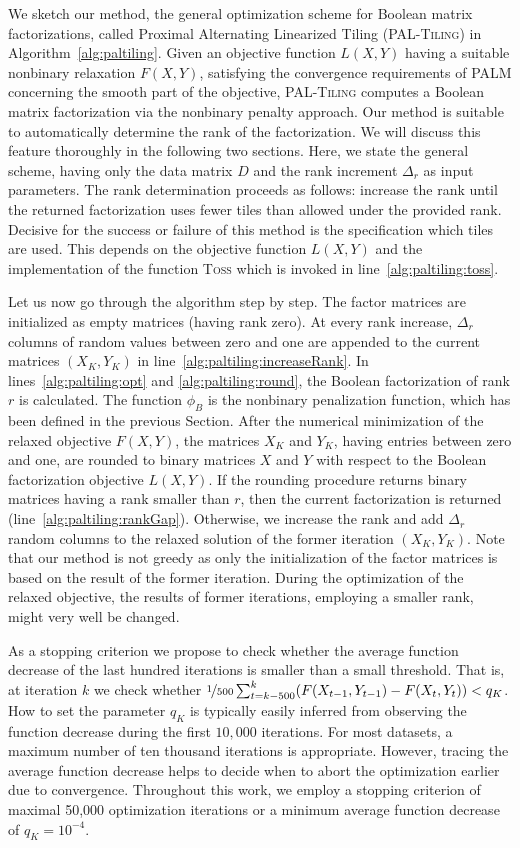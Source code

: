 We sketch our method, the general optimization scheme for Boolean matrix factorizations, called Proximal Alternating Linearized Tiling (\textsc{PAL-Tiling}) in Algorithm~\ref{alg:paltiling}. Given an objective function $L(X,Y)$ having a suitable nonbinary relaxation $F(X,Y)$, satisfying the convergence requirements of PALM concerning the smooth part of the objective, \textsc{PAL-Tiling} computes a Boolean matrix factorization via the nonbinary penalty approach. Our method is suitable to automatically determine the rank of the factorization. We will discuss this feature thoroughly in the following two sections. Here, we state the general scheme, having only the data matrix $D$ and the rank increment $\Delta_r$ as input parameters. The rank determination proceeds as follows: increase the rank until the returned factorization uses fewer tiles than allowed under the provided rank. Decisive for the success or failure of this method is the specification which tiles are used. This depends on the objective function $L(X,Y)$ and the implementation of the function \textsc{Toss} which is invoked in line~\ref{alg:paltiling:toss}.

Let us now go through the algorithm step by step. 
The factor matrices are initialized as empty matrices (having rank zero). At every rank increase, $\Delta_r$ columns of random values between zero and one are appended to the current matrices $(X_K,Y_K)$ in line~\ref{alg:paltiling:increaseRank}. In lines~\ref{alg:paltiling:opt} and \ref{alg:paltiling:round}, the Boolean factorization of rank $r$ is calculated. The function $\phi_B$ is the nonbinary penalization function, which has been defined in the previous Section. After the numerical minimization of the relaxed objective $F(X,Y)$, the matrices $X_K$ and $Y_K$, having entries between zero and one, are rounded to binary matrices $X$ and $Y$ with respect to the Boolean factorization objective $L(X,Y)$. If the rounding procedure returns binary matrices having a rank smaller than $r$, then the current factorization is returned (line~\ref{alg:paltiling:rankGap}). Otherwise, we increase the rank and add $\Delta_r$ random columns to the relaxed solution of the former iteration $(X_K,Y_K)$. Note that our method is not greedy as only the initialization of the factor matrices is based on the result of the former iteration. During the optimization of the relaxed objective, the results of former iterations, employing a smaller rank, might very well be changed.

As a stopping criterion we propose to check whether the average function decrease of the last hundred iterations is smaller than a small threshold. That is, at iteration $k$ we check whether $\nicefrac{1}{500}\sum_{t=k-500}^k(F(X_{t-1},Y_{t-1})-F(X_t,Y_t))<q_K$. How to set the parameter $q_K$ is typically easily inferred from observing the function decrease during the first $10,000$ iterations. For most datasets, a maximum number of ten thousand iterations is appropriate. However, tracing the average function decrease helps to decide when to abort the optimization earlier due to convergence. Throughout this work, we employ a stopping criterion of maximal 50,000 optimization iterations or a minimum average function decrease of $q_K=10^{-4}$.

